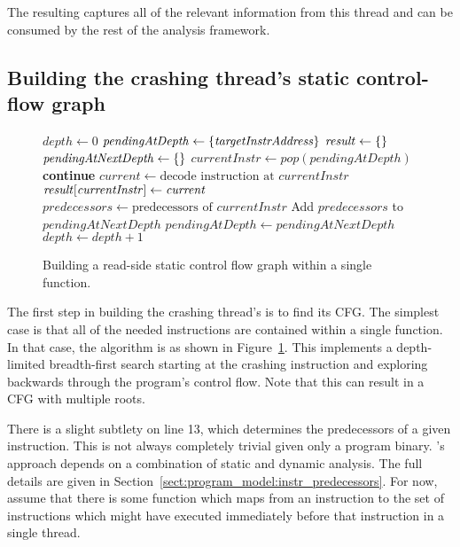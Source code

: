 The resulting {\StateMachine} captures all of the relevant information
from this thread and can be consumed by the rest of the analysis
framework.

\subsection{Building the crashing thread's static control-flow graph}
\label{sect:derive:build_static_cfg}

\begin{figure}
\begin{algorithmic}[1]
\State $\mathit{depth} \gets 0$
\State $\mathit{pendingAtDepth} \gets \{\mathit{targetInstrAddress}\}$
\State $\mathit{result} \gets \{\}$
  \State $\mathit{pendingAtNextDepth} \gets \{\}$
    \State $\mathit{currentInstr} \gets \mathit{pop}(\mathit{pendingAtDepth})$
      \State \textbf{continue}
    \EndIf
    \State $\mathit{current} \gets \text{decode instruction at } \mathit{currentInstr}$
    \State $\mathit{result}[\mathit{currentInstr}] \gets \mathit{current}$
    \State $\mathit{predecessors} \gets \text{predecessors of } \mathit{currentInstr}$
    \State Add $\mathit{predecessors}$ to $\mathit{pendingAtNextDepth}$
  \EndWhile
  \State $\mathit{pendingAtDepth} \gets \mathit{pendingAtNextDepth}$
  \State $\mathit{depth} \gets \mathit{depth} + 1$
\EndWhile
\end{algorithmic}
\caption{Building a read-side static control flow graph within a
  single function.}
\label{fig:derive:static_read_cfg_single_function}
\end{figure}

The first step in building the crashing thread's {\StateMachine} is to
find its CFG.  The simplest case is that all of the needed
instructions are contained within a single function.  In that case,
the algorithm is as shown in
Figure~\ref{fig:derive:static_read_cfg_single_function}.  This
implements a depth-limited breadth-first search starting at the
crashing instruction and exploring backwards through the program's
control flow.  Note that this can result in a CFG with multiple roots.

There is a slight subtlety on line 13, which determines the
predecessors of a given instruction.  This is not always completely
trivial given only a program binary.  {\Technique}'s approach depends
on a combination of static and dynamic analysis.  The full details are
given in Section~\ref{sect:program_model:instr_predecessors}.  For
now, assume that there is some function which maps from an instruction
to the set of instructions which might have executed immediately
before that instruction in a single thread.

